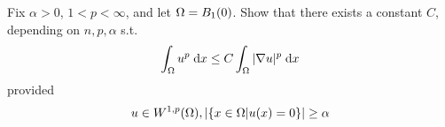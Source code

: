 Fix $\alpha > 0$, $1 < p < \infty$, and let $\Omega = B_1(0)$.
Show that there exists a constant $C$, depending on $n, p, \alpha$ s.t.
$$
\int_\Omega u^p \;\mathrm{d}x \leq C \int_\Omega |\nabla u|^p \;\mathrm{d}x
$$
provided
$$
u \in W^{1, p}(\Omega), |\{ x \in \Omega | u(x) = 0 \}| \geq \alpha
$$
